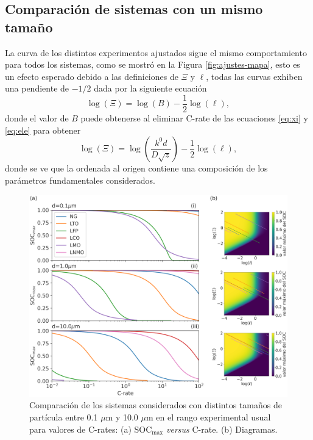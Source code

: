 \subsection{Comparación de sistemas con un mismo tamaño}

La curva de los distintos experimentos ajustados sigue el mismo comportamiento 
para todos los sistemas, como se mostró en la Figura \ref{fig:ajustes-mapa},
esto es un efecto esperado debido a las definiciones de $\Xi$ y $\ell$, todas las
curvas exhiben una pendiente de $-1/2$ dada por la siguiente ecuación
\begin{equation}
    \log(\Xi) = \log(B) - \frac{1}{2}\log(\ell),
\end{equation}
donde el valor de $B$ puede obtenerse al eliminar C-rate de las ecuaciones 
\ref{eq:xi} y \ref{eq:ele} para obtener
\begin{equation}
    \log(\Xi) = \log\left(\frac{k^0 d}{D \sqrt{z}}\right) - \frac{1}{2}\log(\ell),
\end{equation}
donde se ve que la ordenada al origen contiene una composición de los parámetros
fundamentales considerados. 

\begin{figure}[h!]
    \centering
    \includegraphics[width=\textwidth]{FastCharging/un/resultados/comparacion/comparacion.png}
    \caption{Comparación de los sistemas considerados con distintos tamaños de 
    partícula entre 0.1 $\mu$m y 10.0 $\mu$m en el rango experimental usual para 
    valores de C-rates: (a) SOC$_{\max}$ \textit{versus} C-rate. (b) Diagramas.}
    \label{fig:comparacion}
\end{figure}

